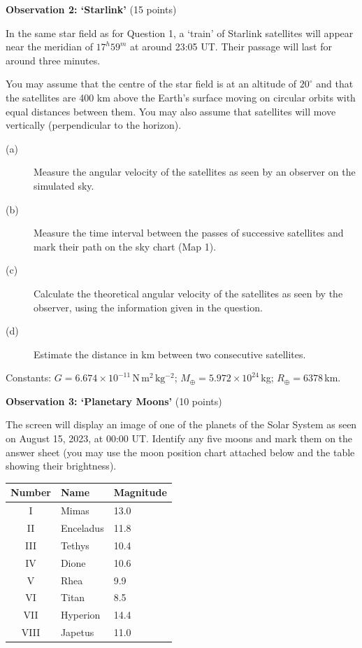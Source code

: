 \medskip
\textbf{Observation 2: `Starlink'} (15 points)

In the same star field as for Question 1, a `train' of Starlink satellites
will appear near the meridian of $17^h59^m$ at around 23:05 UT. Their
passage will last for around three minutes.

You may assume that the centre of the star field is at an altitude of
$20^\circ$ and that the satellites are 400 km above the Earth's surface
moving on circular orbits with equal distances between them. You may also
assume that satellites will move vertically (perpendicular to the horizon).

\begin{description}
\item[(a)] Measure the angular velocity of the satellites as seen by an
  observer on the simulated sky.
\item[(b)] Measure the time interval between the passes of successive
  satellites and mark their path on the sky chart (Map 1).
\item[(c)] Calculate the theoretical angular velocity of the satellites as
  seen by the observer, using the information given in the question.
\item[(d)] Estimate the distance in km between two consecutive satellites.
\end{description}

Constants: $G = 6.674 \times 10^{-11}\,\mathrm{N\,m^2\,kg^{-2}}$;
$M_\oplus = 5.972 \times 10^{24}$\,kg; $R_\oplus = 6378$\,km.

\medskip
\textbf{Observation 3: `Planetary Moons'} (10 points)

The screen will display an image of one of the planets of the Solar System
as seen on August 15, 2023, at 00:00 UT. Identify any five moons and mark
them on the answer sheet (you may use the moon position chart attached below
and the table showing their brightness).


\begin{center}
\begin{tabular}{cll}
Number & Name & Magnitude \\
\hline
I & Mimas & 13.0 \\
II & Enceladus & 11.8 \\
III & Tethys & 10.4 \\
IV & Dione & 10.6 \\
V & Rhea & 9.9 \\
VI & Titan & 8.5 \\
VII & Hyperion & 14.4 \\
VIII & Japetus & 11.0 \\
\end{tabular}
\end{center}

